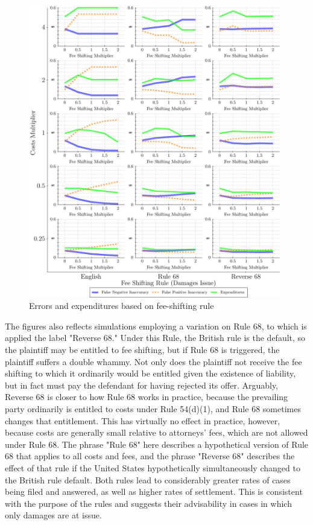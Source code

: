 \documentclass{article}
\begin{document}
\begin{figure}
\begin{minipage}{0.48\textwidth}
        \includegraphics[width=0.98\textwidth, scale=0.70, trim={0in 0in 0in 0in}, clip]{../Figures/Accuracy and Expenditures Varying Fee Shifting Rule (Damages Issue)} %
        \caption{Errors and expenditures based on fee-shifting rule}
		\label{fig:accexp_damagesrule}
    \end{minipage}
\end{figure}

The figures also reflects simulations employing a variation on Rule 68, to which is applied the label "Reverse 68." Under this Rule, the British rule is the default, so the plaintiff may be entitled to fee shifting, but if Rule 68 is triggered, the plaintiff suffers a double whammy. Not only does the plaintiff not receive the fee shifting to which it ordinarily would be entitled given the existence of liability, but in fact must pay the defendant for having rejected its offer. Arguably, Reverse 68 is closer to how Rule 68 works in practice, because the prevailing party ordinarily is entitled to costs under Rule 54(d)(1), and Rule 68 sometimes changes that entitlement. This has virtually no effect in practice, however, because costs are generally small relative to attorneys' fees, which are not allowed under Rule 68. The phrase "Rule 68" here describes a hypothetical version of Rule 68 that applies to all costs and fees, and the phrase "Reverse 68" describes the effect of that rule if the United States hypothetically simultaneously changed to the British rule default. Both rules lead to considerably greater rates of cases being filed and answered, as well as higher rates of settlement. This is consistent with the purpose of the rules and suggests their advisability in cases in which only damages are at issue.
\end{document}
